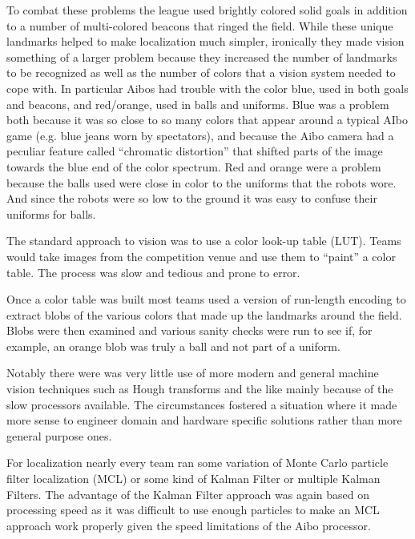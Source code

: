 \documentclass{llncs}
\begin{document}
To combat these problems the league used brightly colored solid goals in addition
to a number of multi-colored beacons that ringed the field. While these unique
landmarks helped to make localization much simpler, ironically they made
vision something of a larger problem because they increased the number of landmarks
to be recognized as well as the number of colors that a vision system needed to
cope with. In particular Aibos had trouble with the color blue, used in both
goals and beacons, and red/orange, used in balls and uniforms. Blue
was a problem both because it was so close to so many colors that appear
around a typical AIbo game (e.g. blue jeans worn by spectators), and because
the Aibo camera had a peculiar feature called ``chromatic distortion'' that
shifted parts of the image towards the blue end of the color spectrum. Red
and orange were a problem because the balls used were close in color to the
uniforms that the robots wore. And since the robots were so low to the ground it
was easy to confuse their uniforms for balls.

The standard approach to vision was to use a color look-up table (LUT).
Teams would take images from the competition venue and use them to
``paint'' a color table. The process was slow and tedious and prone to error.

Once a color table was built most teams used a version of run-length encoding
to extract blobs of the various colors that made up the landmarks around the field.
Blobs were then examined and various sanity checks were run to see if,
for example, an orange blob was truly a ball and not part of a uniform.

Notably there were was very little use of more modern and general machine vision techniques
such as Hough transforms and the like mainly because of the slow processors
available. The circumstances fostered a situation where it made more sense
to engineer domain and hardware specific solutions rather than more general
purpose ones.

For localization nearly every team ran some variation of Monte Carlo
particle filter localization (MCL) or some kind of Kalman Filter or
multiple Kalman Filters. The advantage of the Kalman Filter approach
was again based on processing speed as it was difficult to use enough
particles to make an MCL approach work properly given the speed limitations
of the Aibo processor.
\end{document}
